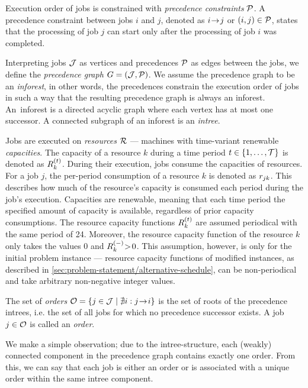 Execution order of jobs is constrained with \emph{precedence constraints} $\mathcal{P}$.
A precedence constraint between jobs $i$ and $j$,
denoted as $i \hspace{-0.2em} \rightarrow \hspace{-0.2em} j$ or $(i, j) \in \mathcal{P}$,
states that the processing of job $j$ can start only after the processing of job $i$ was completed.

Interpreting jobs $\mathcal{J}$ as vertices and precedences $\mathcal{P}$ as edges between the jobs,
we define the \emph{precedence graph} $G = (\mathcal{J}, \mathcal{P})$.
We assume the precedence graph to be an \emph{inforest}, in other words,
the precedences constrain the execution order of jobs in such a way that the resulting precedence graph
is always an inforest.
An~inforest is a directed acyclic graph where each vertex has at most one successor.
A connected subgraph of an inforest is an \emph{intree}.

Jobs are executed on \emph{resources} $\mathcal{R}$ --- machines with time-variant renewable \emph{capacities}.
The capacity of a resource $k$ during a time period $t \in \{{1}, \dots, {\mathcal{T}}\}$ is denoted as $\capacity{k}{t}$.
During their execution, jobs consume the capacities of resources.
For a job $j$, the per-period consumption of a resource $k$ is denoted as $r_{j k}$.
This describes how much of the resource's capacity is consumed each period during the job's execution.
Capacities are renewable, meaning that each time period the specified amount of capacity is available,
regardless of prior capacity consumptions.
The resource capacity functions $\capacity{k}{t}$ are assumed periodical with the same period of 24.
Moreover, the resource capacity function of the resource $k$ only takes the values
$0$ and $\shiftcapacity{k} \negmedspace>\! 0$.
This assumption, however, is only for the initial problem instance
--- resource capacity functions of modified instances, as described in \cref{sec:problem-statement/alternative-schedule},
can be non-periodical and take arbitrary non-negative integer values.

The set of \emph{orders} $\mathcal{O} = \{ j \in \mathcal{J} \mid \nexists i : j \hspace{-0.2em} \rightarrow \hspace{-0.2em} i \}$
is the set of roots of the precedence intrees,
i.e. the set of all jobs for which no precedence successor exists.
A job $j \in \mathcal{O}$ is called an \emph{order}.

We make a simple observation; due to the intree-structure,
each (weakly) connected component in the precedence graph contains exactly one order.
From this, we can say that each job is either an order
or is associated with a unique order within the same intree component.

